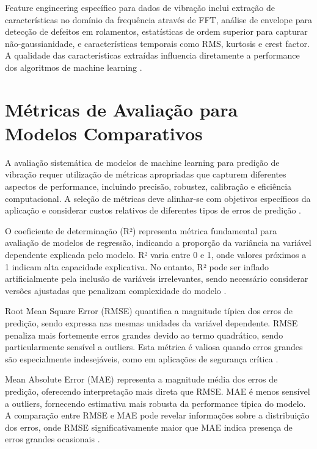 Feature engineering específico para dados de vibração inclui extração de características no domínio da frequência através de FFT, análise de envelope para detecção de defeitos em rolamentos, estatísticas de ordem superior para capturar não-gaussianidade, e características temporais como RMS, kurtosis e crest factor. A qualidade das características extraídas influencia diretamente a performance dos algoritmos de machine learning \cite{lei2020applications}.

\section{Métricas de Avaliação para Modelos Comparativos}
\label{sec:metricas-avaliacao}

A avaliação sistemática de modelos de machine learning para predição de vibração requer utilização de métricas apropriadas que capturem diferentes aspectos de performance, incluindo precisão, robustez, calibração e eficiência computacional. A seleção de métricas deve alinhar-se com objetivos específicos da aplicação e considerar custos relativos de diferentes tipos de erros de predição \cite{botchkarev2018performance}.

O coeficiente de determinação (R²) representa métrica fundamental para avaliação de modelos de regressão, indicando a proporção da variância na variável dependente explicada pelo modelo. R² varia entre 0 e 1, onde valores próximos a 1 indicam alta capacidade explicativa. No entanto, R² pode ser inflado artificialmente pela inclusão de variáveis irrelevantes, sendo necessário considerar versões ajustadas que penalizam complexidade do modelo \cite{steel2013principles}.

Root Mean Square Error (RMSE) quantifica a magnitude típica dos erros de predição, sendo expressa nas mesmas unidades da variável dependente. RMSE penaliza mais fortemente erros grandes devido ao termo quadrático, sendo particularmente sensível a outliers. Esta métrica é valiosa quando erros grandes são especialmente indesejáveis, como em aplicações de segurança crítica \cite{willmott2005advantages}.

Mean Absolute Error (MAE) representa a magnitude média dos erros de predição, oferecendo interpretação mais direta que RMSE. MAE é menos sensível a outliers, fornecendo estimativa mais robusta da performance típica do modelo. A comparação entre RMSE e MAE pode revelar informações sobre a distribuição dos erros, onde RMSE significativamente maior que MAE indica presença de erros grandes ocasionais \cite{willmott2005advantages}.

